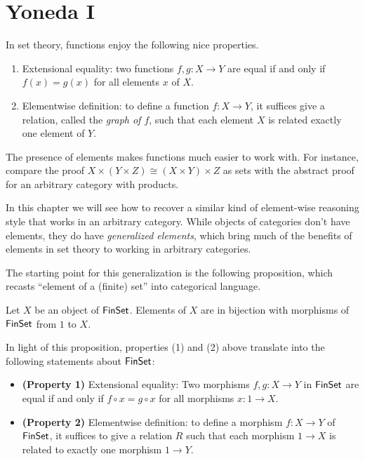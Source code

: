 \chapter{Yoneda I}

\noindent In set theory, functions enjoy the following nice properties.
\begin{enumerate}
\item Extensional equality: two functions \(f,g : X \to Y\)
  are equal if and only if \(f(x) = g(x)\) for all elements \(x\) of \(X\).
\item Elementwise definition:
  to define a function \(f : X \to Y\),
  it suffices give a relation,
  called the \emph{graph of \(f\)},
  such that each element \(X\)
  is related exactly one element of \(Y\).
\end{enumerate}
The presence of elements makes functions much easier to work with.
For instance, compare the proof \(X \times (Y \times Z) \cong (X\times Y) \times Z\)
as sets with the abstract proof for an arbitrary category with products.

In this chapter we will see how to recover a similar kind of element-wise reasoning
style that works in an arbitrary category.
While objects of categories don't have elements,
they do have \emph{generalized elements},
which bring much of the benefits of elements in set theory
to working in arbitrary categories.

The starting point for this generalization is the following
proposition, which recasts ``element of a (finite) set'' into categorical language.
\begin{proposition}
  Let \(X\) be an object of \(\mathsf{FinSet}\).
  Elements of \(X\) are in bijection
  with morphisms of \(\mathsf{FinSet}\)
  from \(1\) to \(X\).
\end{proposition}
In light of this proposition, properties (1) and (2)
above translate into the following statements about \(\mathsf{FinSet}\):
\begin{itemize}
\item \textbf{(Property 1)} Extensional equality:
  Two morphisms \(f,g : X \to Y\)
  in \(\mathsf{FinSet}\) are equal if and only if \(f \circ x = g \circ x\)
  for all morphisms \(x : 1 \to X\).
\item \textbf{(Property 2)} Elementwise definition:
  to define a morphism \(f : X \to Y\)
  of \(\mathsf{FinSet}\),
  it suffices to give a relation \(R\)
  such that each
  morphism \(1 \to X\)
  is related to exactly one morphism \(1 \to Y\).
\end{itemize}

